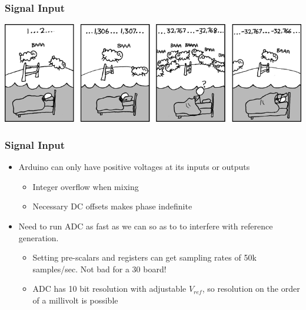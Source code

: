 \documentclass{beamer}
\begin{document}
\begin{frame}
\frametitle{Signal Input}
\begin{center}
\hspace*{-.45cm}\includegraphics[scale=.5]{cant_sleep.png}
\end{center}
\end{frame}
\begin{frame}
\frametitle{Signal Input}
\begin{itemize}
	\item {Arduino can only have positive voltages at its inputs or outputs}
		\begin{itemize}
			\item {Integer overflow when mixing}
			\item {Necessary DC offsets makes phase indefinite}
		\end{itemize}
	\item {Need to run ADC as fast as we can so as to to interfere with reference generation.}

		\begin{itemize}
			\item{Setting pre-scalars and registers can get sampling rates of 50k samples/sec. Not bad for  a 30 board!}
			\item{ADC has 10 bit resolution with adjustable $V_{ref}$, so resolution on the order of a millivolt is possible}
		\end{itemize}
\end{itemize}

\end{frame}
\end{document}
